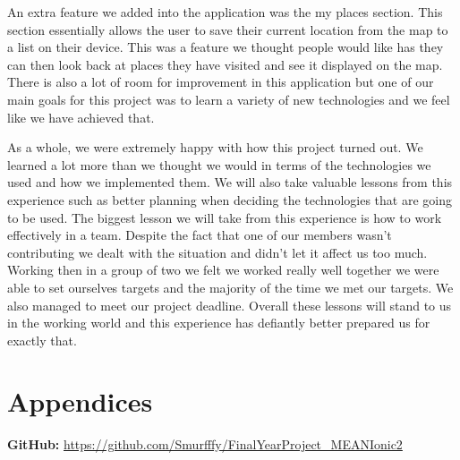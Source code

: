 An extra feature we added into the application was the my places section. This section essentially allows the user to save their current location from the map to a list on their device. This was a feature we thought people would like has they can then look back at places they have visited and see it displayed on the map. There is also a lot of room for improvement in this application but one of our main goals for this project was to learn a variety of new technologies and we feel like we have achieved that.

As a whole, we were extremely happy with how this project turned out. We learned a lot more than we thought we would in terms of the technologies we used and how we implemented them. We will also take valuable lessons from this experience such as better planning when deciding the technologies that are going to be used. The biggest lesson we will take from this experience is how to work effectively in a team. Despite the fact that one of our members wasn't contributing we dealt with the situation and didn't let it affect us too much. Working then in a group of two we felt we worked really well together we were able to set ourselves targets and the majority of the time we met our targets. We also managed to meet our project deadline. Overall these lessons will stand to us in the working world and this experience has defiantly better prepared us for exactly that. 

\chapter{Appendices}

\textbf {GitHub: } \url{https://github.com/Smurfffy/FinalYearProject_MEANIonic2}

